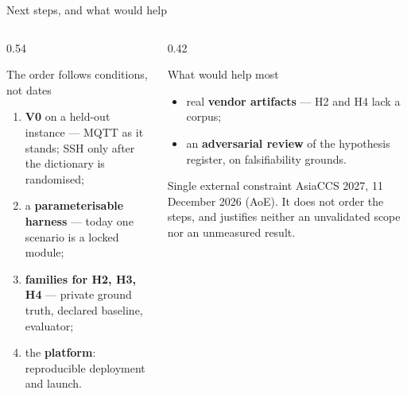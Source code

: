 \documentclass[aspectratio=169,10pt]{beamer}
\begin{document}
\begin{frame}{Next steps, and what would help}

  \begin{columns}[T,onlytextwidth]
    \begin{column}{0.54\textwidth}
      \begin{block}{The order follows conditions, not dates}
        \small
        \begin{enumerate}
          \item \textbf{V0} on a held-out instance --- MQTT as it stands; SSH
                only after the dictionary is randomised;
          \item a \textbf{parameterisable harness} --- today one scenario is a
                locked module;
          \item \textbf{families for H2, H3, H4} --- private ground truth,
                declared baseline, evaluator;
          \item the \textbf{platform}: reproducible deployment and launch.
        \end{enumerate}
      \end{block}
    \end{column}
    \begin{column}{0.42\textwidth}
      \begin{exampleblock}{What would help most}
        \small
        \begin{itemize}
          \item real \textbf{vendor artifacts} --- H2 and H4 lack a corpus;
          \item an \textbf{adversarial review} of the hypothesis register, on
                falsifiability grounds.
        \end{itemize}
      \end{exampleblock}
      \vspace{0.3em}
      \begin{alertblock}{Single external constraint}
        \scriptsize AsiaCCS 2027, 11 December 2026 (AoE). It does not order the
        steps, and justifies neither an unvalidated scope nor an unmeasured
        result.
      \end{alertblock}
    \end{column}
  \end{columns}

\end{frame}

\appendix
\end{document}
